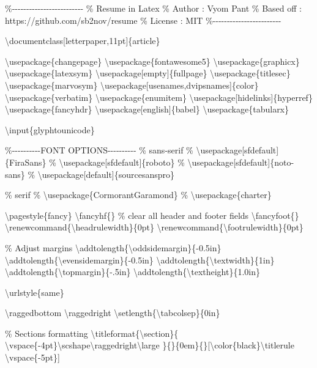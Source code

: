  \%-\/-\/-\/-\/-\/-\/-\/-\/-\/-\/-\/-\/-\/-\/-\/-\/-\/-\/-\/-\/-\/-\/-\/-\/-
\% Resume in Latex \% Author : Vyom Pant \% Based off :
https://github.com/sb2nov/resume \% License : MIT
\%-\/-\/-\/-\/-\/-\/-\/-\/-\/-\/-\/-\/-\/-\/-\/-\/-\/-\/-\/-\/-\/-\/-\/-

\textbackslash documentclass{[}letterpaper,11pt{]}\{article\}

\textbackslash usepackage\{changepage\}
\textbackslash usepackage\{fontawesome5\}
\textbackslash usepackage\{graphicx\}
\textbackslash usepackage\{latexsym\}
\textbackslash usepackage{[}empty{]}\{fullpage\}
\textbackslash usepackage\{titlesec\}
\textbackslash usepackage\{marvosym\}
\textbackslash usepackage{[}usenames,dvipsnames{]}\{color\}
\textbackslash usepackage\{verbatim\}
\textbackslash usepackage\{enumitem\}
\textbackslash usepackage{[}hidelinks{]}\{hyperref\}
\textbackslash usepackage\{fancyhdr\}
\textbackslash usepackage{[}english{]}\{babel\}
\textbackslash usepackage\{tabularx\}

\textbackslash input\{glyphtounicode\}

\%-\/-\/-\/-\/-\/-\/-\/-\/-\/-FONT OPTIONS-\/-\/-\/-\/-\/-\/-\/-\/-\/-
\% sans-serif \% \textbackslash usepackage{[}sfdefault{]}\{FiraSans\} \%
\textbackslash usepackage{[}sfdefault{]}\{roboto\} \%
\textbackslash usepackage{[}sfdefault{]}\{noto-sans\} \%
\textbackslash usepackage{[}default{]}\{sourcesanspro\}

\% serif \% \textbackslash usepackage\{CormorantGaramond\} \%
\textbackslash usepackage\{charter\}

\textbackslash pagestyle\{fancy\} \textbackslash fancyhf\{\} \% clear
all header and footer fields \textbackslash fancyfoot\{\}
\textbackslash renewcommand\{\textbackslash headrulewidth\}\{0pt\}
\textbackslash renewcommand\{\textbackslash footrulewidth\}\{0pt\}

\% Adjust margins
\textbackslash addtolength\{\textbackslash oddsidemargin\}\{-0.5in\}
\textbackslash addtolength\{\textbackslash evensidemargin\}\{-0.5in\}
\textbackslash addtolength\{\textbackslash textwidth\}\{1in\}
\textbackslash addtolength\{\textbackslash topmargin\}\{-.5in\}
\textbackslash addtolength\{\textbackslash textheight\}\{1.0in\}

\textbackslash urlstyle\{same\}

\textbackslash raggedbottom \textbackslash raggedright
\textbackslash setlength\{\textbackslash tabcolsep\}\{0in\}

\% Sections formatting
\textbackslash titleformat\{\textbackslash section\}\{
\textbackslash vspace\{-4pt\}\textbackslash scshape\textbackslash raggedright\textbackslash large
\}\{\}\{0em\}\{\}{[}\textbackslash color\{black\}\textbackslash titlerule
\textbackslash vspace\{-5pt\}{]}

